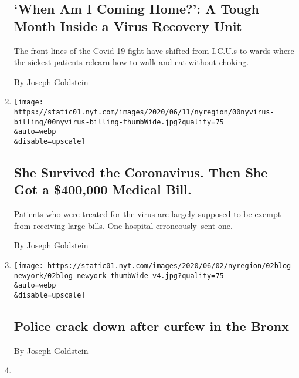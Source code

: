 \begin{enumerate}
  \hypertarget{when-am-i-coming-home-a-tough-month-inside-a-virus-recovery-unit}{%
  \subsection{`When Am I Coming Home?': A Tough Month Inside a Virus
  Recovery
  Unit}\label{when-am-i-coming-home-a-tough-month-inside-a-virus-recovery-unit}}

  The front lines of the Covid-19 fight have shifted from I.C.U.s to
  wards where the sickest patients relearn how to walk and eat without
  choking.

  By Joseph Goldstein
\item
  \href{/2020/06/14/nyregion/coronavirus-billing-nyc.html}{}

  \texttt{[image: https://static01.nyt.com/images/2020/06/11/nyregion/00nyvirus-billing/00nyvirus-billing-thumbWide.jpg?quality=75\\\&auto=webp\\\&disable=upscale]}

  \hypertarget{she-survived-the-coronavirus-then-she-got-a-400000-medical-bill}{%
  \subsection{She Survived the Coronavirus. Then She Got a \$400,000
  Medical
  Bill.}\label{she-survived-the-coronavirus-then-she-got-a-400000-medical-bill}}

  Patients who were treated for the virus are largely supposed to be
  exempt from receiving large bills. One hospital erroneously~sent one.

  By Joseph Goldstein
\item
  \href{/live/2020/protests-george-floyd-police-06-02/police-crack-down-after-curfew-in-the-bronx}{}

  \texttt{[image: https://static01.nyt.com/images/2020/06/02/nyregion/02blog-newyork/02blog-newyork-thumbWide-v4.jpg?quality=75\\\&auto=webp\\\&disable=upscale]}

  \hypertarget{police-crack-down-after-curfew-in-the-bronx}{%
  \subsection{Police crack down after curfew in the
  Bronx}\label{police-crack-down-after-curfew-in-the-bronx}}

  By Joseph Goldstein
\item
  \href{/2020/05/22/nyregion/children-coronavirus-syndrome-new-york.html}{}


\end{enumerate}
